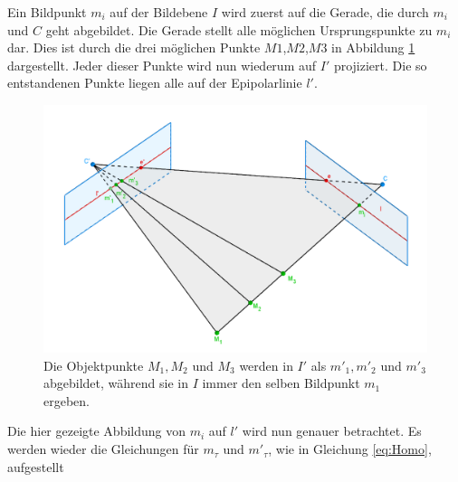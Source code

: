 Ein Bildpunkt $m_i$ auf der Bildebene $I$ wird zuerst auf die Gerade, die durch $m_i$ und $C$ geht abgebildet. Die Gerade stellt alle möglichen Ursprungspunkte zu $m_i$ dar. Dies ist durch die drei möglichen Punkte $M1$,$M2$,$M3$ in Abbildung \ref{fig:Epipolarconstraint} dargestellt. Jeder dieser Punkte wird nun wiederum auf $I'$ projiziert. Die so entstandenen Punkte liegen alle auf der Epipolarlinie $l'$\cite{HZ}. 


\begin{figure}[!htb]
	\centering
	\includegraphics[width=.8\linewidth]{images/EpipolarLinien.png}
	\caption[Abbildungsvorschrift]{Die Objektpunkte $M_1, M_2$ und $M_3$ werden in $I'$ als $m'_1, m'_2$ und $m'_3$ abgebildet, während sie in $I$ immer den selben Bildpunkt $m_1$ ergeben.}  
	\label{fig:Epipolarconstraint}
\end{figure}


Die hier gezeigte Abbildung von $m_i$ auf $l'$ wird nun genauer betrachtet. Es werden wieder die Gleichungen für $m_\tau$ und $m'_\tau$, wie in Gleichung \ref{eq:Homo}, aufgestellt    


